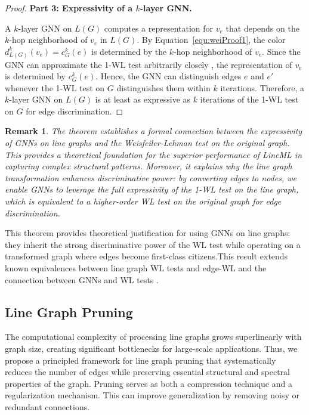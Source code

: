 \documentclass[pdflatex,sn-mathphys-num]{sn-jnl}%
\theoremstyle{thmstyleone}%
\theoremstyle{thmstyletwo}%
\newtheorem{remark}{Remark}%
\theoremstyle{thmstylethree}%
\theoremstyle{plain} %
\theoremstyle{definition} %
\theoremstyle{remark} %
\theoremstyle{plain} %
\begin{document}
\begin{proof}
\noindent\textbf{Part 3: Expressivity of a $k$-layer GNN.}

A $k$-layer GNN on $L(G)$ computes a representation for $v_e$ that depends on the $k$-hop neighborhood of $v_e$ in $L(G)$. By Equation~\ref{equ:weiProof1}, the color $d^k_{L(G)}(v_e) = c^k_G(e)$ is determined by the $k$-hop neighborhood of $v_e$. Since the GNN can approximate the 1-WL test arbitrarily closely \cite{xu2018how}, the representation of $v_e$ is determined by $c^k_G(e)$. Hence, the GNN can distinguish edges $e$ and $e'$ whenever the 1-WL test on $G$ distinguishes them within $k$ iterations. Therefore, a $k$-layer GNN on $L(G)$ is at least as expressive as $k$ iterations of the 1-WL test on $G$ for edge discrimination.
\end{proof}

\begin{remark}
The theorem establishes a formal connection between the expressivity of GNNs on line graphs and the Weisfeiler-Lehman test on the original graph. This provides a theoretical foundation for the superior performance of LineML in capturing complex structural patterns. Moreover, it explains why the line graph transformation enhances discriminative power: by converting edges to nodes, we enable GNNs to leverage the full expressivity of the 1-WL test on the line graph, which is equivalent to a higher-order WL test on the original graph for edge discrimination.
\end{remark}

This theorem provides theoretical justification for using GNNs on line graphs: they inherit the strong discriminative power of the WL test while operating on a transformed graph where edges become first-class citizens.This result extends known equivalences between line graph WL tests and edge-WL \cite{bodnar2021weisfeiler,chen2021link} and the connection between GNNs and WL tests \cite{xu2018how}.



    
\subsection{Line Graph Pruning}
\label{subsec:linegraph_pruning}

The computational complexity of processing line graphs grows superlinearly with graph size, creating significant bottlenecks for large-scale applications. 
Thus, we propose a principled framework for line graph pruning that systematically reduces the number of edges while preserving essential structural and spectral properties of the graph. 
Pruning serves as both a compression technique and a regularization mechanism.
This can improve generalization by removing noisy or redundant connections. 
\end{document}

